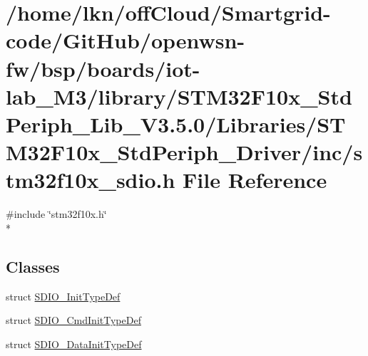\hypertarget{iot-lab___m3_2library_2_s_t_m32_f10x___std_periph___lib___v3_85_80_2_libraries_2_s_t_m32_f10x___10050169f82766a4f45dc2c3a38de226}{}\section{/home/lkn/off\+Cloud/\+Smartgrid-\/code/\+Git\+Hub/openwsn-\/fw/bsp/boards/iot-\/lab\+\_\+\+M3/library/\+S\+T\+M32\+F10x\+\_\+\+Std\+Periph\+\_\+\+Lib\+\_\+\+V3.5.0/\+Libraries/\+S\+T\+M32\+F10x\+\_\+\+Std\+Periph\+\_\+\+Driver/inc/stm32f10x\+\_\+sdio.h File Reference}
\label{iot-lab___m3_2library_2_s_t_m32_f10x___std_periph___lib___v3_85_80_2_libraries_2_s_t_m32_f10x___10050169f82766a4f45dc2c3a38de226}
{\ttfamily \#include \char`\"{}stm32f10x.\+h\char`\"{}}\\*
\subsection*{Classes}
\begin{DoxyCompactItemize}
\item 
struct \hyperlink{struct_s_d_i_o___init_type_def}{S\+D\+I\+O\+\_\+\+Init\+Type\+Def}
\item 
struct \hyperlink{struct_s_d_i_o___cmd_init_type_def}{S\+D\+I\+O\+\_\+\+Cmd\+Init\+Type\+Def}
\item 
struct \hyperlink{struct_s_d_i_o___data_init_type_def}{S\+D\+I\+O\+\_\+\+Data\+Init\+Type\+Def}
\end{DoxyCompactItemize}
